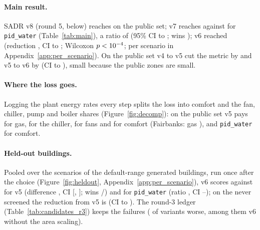 \documentclass{article}
\begin{document}
\paragraph{Main result.}
SADR v8 (round 5, below) reaches \RFiveConfPubCand{} on the public set; v7 reaches \RFConfPubCand{} against
\MetricPidWater{} for \texttt{pid\_water}
(Table~\ref{tab:main}), a ratio of \RFPwPubRatio{} (95\% CI \RFPwPubRatioLo{} to
\RFPwPubRatioHi; wins \RFPwPubWins); v6 reached \MetricOurs{} (reduction \RelRedPidWater, CI
\RelRedLoPidWater{} to \RelRedHiPidWater; Wilcoxon $p<10^{-4}$; per scenario in
Appendix~\ref{app:per_scenario}). On the public set v4 to v5 cut the metric by \CandWinnerRelRed{}
and v5 to v6 by \RelRedOursVFive{} (CI \RelRedLoOursVFive{} to \RelRedHiOursVFive), small because the
public zones are small.

\paragraph{Where the loss goes.}
Logging the plant energy rates every step splits the loss into comfort and the fan, chiller,
pump and boiler shares (Figure~\ref{fig:decomp}): on the public set v5 pays \DecPubVFiveGasShare{} for
gas, \DecPubVFiveCoolingShare{} for the chiller, \DecPubVFiveFanShare{} for fans and
\DecPubVFiveComfortShare{} for comfort (Fairbanks: gas \DecPubVFiveGasShareFairbanks), and
\texttt{pid\_water} \RegretSharePidWater{} for comfort.

\paragraph{Held-out buildings.}
Pooled over the \NHeldAll{} scenarios of the \NHeldAllBuild{} default-range generated buildings, run
once after the choice (Figure~\ref{fig:heldout}, Appendix~\ref{app:per_scenario}), v6 scores
\HeldAllMetricOurs{} against \HeldAllMetricOursVFive{} for v5 (difference \HeldAllVFiveDiff, CI
[\HeldAllVFiveDiffLo, \HeldAllVFiveDiffHi]; wins \HeldAllVFiveWins/\NHeldAll) and
\HeldAllMetricPidWater{} for \texttt{pid\_water} (ratio \HeldAllPidWaterRatio, CI
\HeldAllPidWaterRatioLo--\HeldAllPidWaterRatioHi); on the \NHeldUnscr{} never screened the reduction from
v5 is \HeldUnscrVFiveRelRed{} (CI \HeldUnscrVFiveRelRedLo{} to \HeldUnscrVFiveRelRedHi). The round-3 ledger
(Table~\ref{tab:candidates_r3}) keeps the failures (\NRThreeWorse{} of \NRThreeVariants{} variants worse,
among them v6 without the area scaling).
\end{document}
